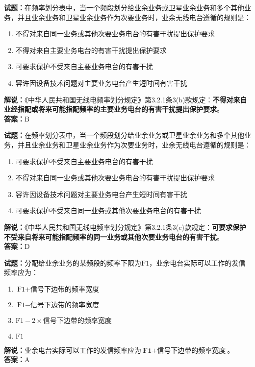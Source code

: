 \documentclass{ctexbook}
\begin{document}
\bigskip


\noindent\textbf{试题：}在频率划分表中，当一个频段划分给业余业务或卫星业余业务和多个其他业务，并且业余业务和卫星业余业务作为次要业务时，业余无线电台遵循的规则是：
\begin{enumerate}[leftmargin=3em]
\item 不得对来自同一业务或其他次要业务电台的有害干扰提出保护要求
\item 不得对来自主要业务电台的有害干扰提出保护要求
\item 可要求保护不受来自主要业务电台的有害干扰
\item 容许因设备技术问题对主要业务电台产生短时间有害干扰
\end{enumerate}
\noindent\textbf{解说：}《中华人民共和国无线电频率划分规定》第3.2.1条3(b)款规定：\textbf{不得对来自业经指配或将来可能指配频率的主要业务电台的有害干扰提出保护要求}。\\\textbf{答案：}B



\bigskip


\noindent\textbf{试题：}在频率划分表中，当一个频段划分给业余业务或卫星业余业务和多个其他业务，并且业余业务和卫星业余业务作为次要业务时，业余无线电台遵循的规则是：
\begin{enumerate}[leftmargin=3em]
\item 可要求保护不受来自主要业务电台的有害干扰
\item 不得对来自同一业务或其他次要业务电台的有害干扰提出保护要求
\item 容许因设备技术问题对主要业务电台产生短时间有害干扰
\item 可要求保护不受来自同一业务或其他次要业务电台的有害干扰
\end{enumerate}
\noindent\textbf{解说：}《中华人民共和国无线电频率划分规定》第3.2.1条3(c)款规定：\textbf{可要求保护不受来自将来可能指配频率的同一业务或其他次要业务电台的有害干扰}。\\\textbf{答案：}D



\bigskip


\noindent\textbf{试题：}分配给业余业务的某频段的频率下限为\(\textrm{F1}\)，业余电台实际可以工作的发信频率应为：
\begin{enumerate}[leftmargin=3em]
\item \(\textrm{F1} + \textrm{信号下边带的频率宽度}\)
\item \(\textrm{F1} - \textrm{信号下边带的频率宽度}\)
\item \(\textrm{F1} - 2 \times \textrm{信号下边带的频率宽度}\)
\item \(\textrm{F1}\)
\end{enumerate}
\noindent\textbf{解说：}业余电台实际可以工作的发信频率应为\(\textbf{F1} + \textbf{信号下边带的频率宽度}\)。
\\\noindent\textbf{答案：}A
\end{document}
